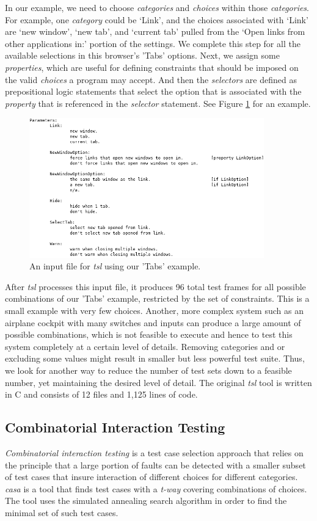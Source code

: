 \documentclass[a4full,12pt]{article}
\begin{document}
In our example, we need to choose \emph{categories} and \emph{choices} within those
  \emph{categories}. For example, one \emph{category} could be `Link', and the choices
  associated with `Link' are `new window', `new tab', and `current tab' pulled from the
  `Open links from other applications in:' portion of the settings. We complete this step for all
  the available selections in this browser's 'Tabs' options. Next, we assign some 
  \emph{properties}, which are useful for defining constraints that should be imposed on
  the valid \emph{choices} a program may accept. And then the \emph{selectors} are defined
  as prepositional logic statements that select the option that is associated with the 
  \emph{property} that is referenced in the \emph{selector} statement. See Figure \ref{fig:tsl_input_final} for an example.
\begin{figure}[htb]
\centering
\includegraphics[width=4in,keepaspectratio]{images/tsl_input_final.png}
\caption{An input file for \emph{tsl} using our 'Tabs' example.}
\label{fig:tsl_input_final}
\end{figure}

After \emph{tsl} processes this input file, it produces 96 total test frames
  for all possible combinations of our 'Tabs' example, restricted by the set of constraints. This is a small example with very
  few choices. Another, more complex system such as an airplane cockpit with many switches
  and inputs can produce a large amount of possible combinations, which is not feasible to execute and hence to test this system completely at a certain level of details. Removing categories and or excluding some values might result in smaller but less powerful test suite. Thus, we look for another way to reduce the number of test sets down to a feasible number, yet maintaining the desired level of detail. The original \emph{tsl} tool is written in C and consists of 12 files and 1,125 lines of code.

\subsection{Combinatorial Interaction Testing}
\emph{Combinatorial interaction testing} is a test case selection approach that relies on the principle
  that a large portion of faults can be detected with a smaller subset of test cases that insure interaction
  of different choices for different categories.  \emph{casa} is a tool that finds test cases with a \emph{t-way} covering 
  combinations of choices. The tool uses the simulated annealing search algorithm in order to find
  the minimal set of such test cases.
  
\end{document}
